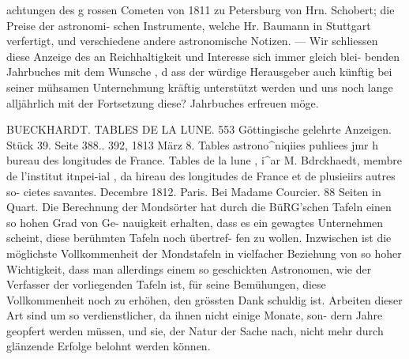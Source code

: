 \documentclass[12pt,a4paper]{article}
\begin{document}
achtungen des g rossen Cometen von 1811 zu Petersburg von Hrn. Schobert; die Preise der astronomi-\newline
schen Instrumente, welche Hr. Baumann in Stuttgart verfertigt, und verschiedene andere astronomische\newline
Notizen. --- Wir schliessen diese Anzeige des an Reichhaltigkeit und Interesse sich immer gleich blei-\newline
benden Jahrbuches mit dem Wunsche , d ass der würdige Herausgeber auch künftig bei seiner mühsamen\newline
Unternehmung kräftig unterstützt werden und uns noch lange alljährlich mit der Fortsetzung diese?\newline
Jahrbuches erfreuen möge.\newline

\newpage
BUECKHARDT. TABLES DE LA LUNE. 553\newline
Göttingische gelehrte Anzeigen. Stück 39. Seite 388.. 392, 1813 März 8.\newline
Tables astrono\^{}niqiies puhliees jmr h bureau des longitudes de France. Tables de la lune , i\^{}ar M.\newline
Bdrckhaedt, membre de l'institut itnpei-ial , da hireau des longitudes de France et de plusieiirs autres so-\newline
cietes savantes. Decembre 1812. Paris. Bei Madame Courcier. 88 Seiten in Quart.\newline
Die Berechnung der Mondsörter hat durch die BüRG'schen Tafeln einen so hohen Grad von Ge-\newline
nauigkeit erhalten, dass es ein gewagtes Unternehmen scheint, diese berühmten Tafeln noch übertref-\newline
fen zu wollen. Inzwischen ist die möglichste Vollkommenheit der Mondstafeln in vielfacher Beziehung\newline
von so hoher Wichtigkeit, dass man allerdings einem so geschickten Astronomen, wie der Verfasser der\newline
vorliegenden Tafeln ist, für seine Bemühungen, diese Vollkommenheit noch zu erhöhen, den grössten\newline
Dank schuldig ist. Arbeiten dieser Art sind um so verdienstlicher, da ihnen nicht einige Monate, son-\newline
dern Jahre geopfert werden müssen, und sie, der Natur der Sache nach, nicht mehr durch glänzende\newline
Erfolge belohnt werden können.\newline
\end{document}
